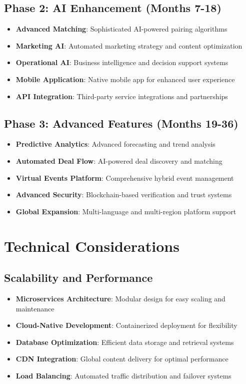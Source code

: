 \subsection{Phase 2: AI Enhancement (Months 7-18)}
\begin{itemize}
    \item \textbf{Advanced Matching}: Sophisticated AI-powered pairing algorithms
    \item \textbf{Marketing AI}: Automated marketing strategy and content optimization
    \item \textbf{Operational AI}: Business intelligence and decision support systems
    \item \textbf{Mobile Application}: Native mobile app for enhanced user experience
    \item \textbf{API Integration}: Third-party service integrations and partnerships
\end{itemize}

\subsection{Phase 3: Advanced Features (Months 19-36)}
\begin{itemize}
    \item \textbf{Predictive Analytics}: Advanced forecasting and trend analysis
    \item \textbf{Automated Deal Flow}: AI-powered deal discovery and matching
    \item \textbf{Virtual Events Platform}: Comprehensive hybrid event management
    \item \textbf{Advanced Security}: Blockchain-based verification and trust systems
    \item \textbf{Global Expansion}: Multi-language and multi-region platform support
\end{itemize}

\section{Technical Considerations}

\subsection{Scalability and Performance}
\begin{itemize}
    \item \textbf{Microservices Architecture}: Modular design for easy scaling and maintenance
    \item \textbf{Cloud-Native Development}: Containerized deployment for flexibility
    \item \textbf{Database Optimization}: Efficient data storage and retrieval systems
    \item \textbf{CDN Integration}: Global content delivery for optimal performance
    \item \textbf{Load Balancing}: Automated traffic distribution and failover systems
\end{itemize}

